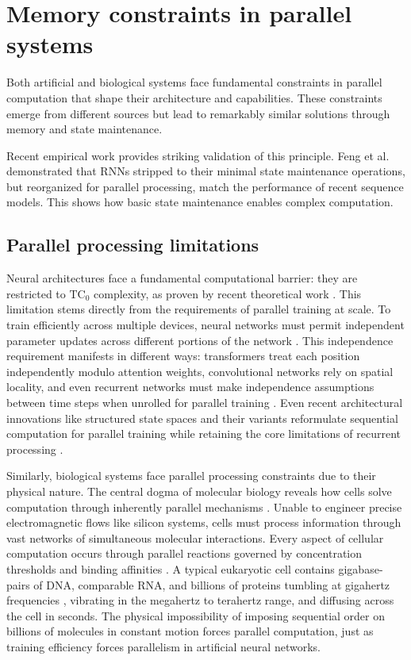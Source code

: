 \documentclass[12pt]{article}
\begin{document}
\section{Memory constraints in parallel systems}

Both artificial and biological systems face fundamental constraints in parallel computation that shape their architecture and capabilities.
These constraints emerge from different sources but lead to remarkably similar solutions through memory and state maintenance.

Recent empirical work provides striking validation of this principle.
Feng et al. \cite{feng2024rnns} demonstrated that RNNs stripped to their minimal state maintenance operations, but reorganized for parallel processing, match the performance of recent sequence models.
This shows how basic state maintenance enables complex computation.

\subsection{Parallel processing limitations}

Neural architectures face a fundamental computational barrier: they are restricted to $\text{TC}_0$ complexity, as proven by recent theoretical work \cite{merrill2023parallelism,peng2024limitations}.
This limitation stems directly from the requirements of parallel training at scale.
To train efficiently across multiple devices, neural networks must permit independent parameter updates across different portions of the network \cite{barrett2019analyzing}.
This independence requirement manifests in different ways: transformers treat each position independently modulo attention weights, convolutional networks rely on spatial locality, and even recurrent networks must make independence assumptions between time steps when unrolled for parallel training \cite{dickson2023rnns}.
Even recent architectural innovations like structured state spaces and their variants reformulate sequential computation for parallel training while retaining the core limitations of recurrent processing \cite{gu2021efficiently,gu2023mamba,dao2024transformers,nguyen2024hyenadna}.

Similarly, biological systems face parallel processing constraints due to their physical nature.
The central dogma of molecular biology reveals how cells solve computation through inherently parallel mechanisms \cite{wang2023parallel,cai2024efficient,fu2023scgrn}.
Unable to engineer precise electromagnetic flows like silicon systems, cells must process information through vast networks of simultaneous molecular interactions.
Every aspect of cellular computation occurs through parallel reactions governed by concentration thresholds and binding affinities \cite{alberts2022molecular}.
A typical eukaryotic cell contains gigabase-pairs of DNA, comparable RNA, and billions of proteins \cite{milo2013protein} tumbling at gigahertz frequencies \cite{zhang2023molecular}, vibrating in the megahertz to terahertz range, and diffusing across the cell in seconds.
The physical impossibility of imposing sequential order on billions of molecules in constant motion forces parallel computation, just as training efficiency forces parallelism in artificial neural networks.
\end{document}
